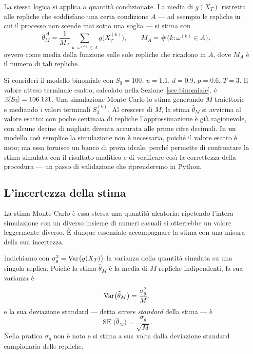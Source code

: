 La stessa logica si applica a quantit\`{a} condizionate. La media di
$g(X_T)$ ristretta alle repliche che soddisfano una certa condizione
$A$ --- ad esempio le repliche in cui il processo non scende mai sotto
una soglia --- si stima con
\[
\widehat{\theta}_M^{\,A}
=\frac{1}{M_A}\sum_{k:\,\omega^{(k)}\in A}g\bigl(X_T^{(k)}\bigr),
\qquad
M_A=\#\{k:\omega^{(k)}\in A\},
\]
ovvero come media della funzione sulle sole repliche che ricadono in $A$,
dove $M_A$ \`{e} il numero di tali repliche.

\begin{example}
\label{es:montecarlo-binomiale}
Si consideri il modello binomiale con $S_0=100$, $u=1.1$, $d=0.9$,
$p=0.6$, $T=3$. Il valore atteso terminale esatto, calcolato nella
Sezione~\ref{sec:binomiale}, \`{e} $\mathbb{E}[S_3]=106.121$. Una simulazione
Monte Carlo lo stima generando $M$ traiettorie e mediando i valori
terminali $S_3^{(k)}$. Al crescere di $M$, la stima
$\widehat{\theta}_M$ si avvicina al valore esatto: con poche centinaia
di repliche l'approssimazione \`{e} gi\`{a} ragionevole, con alcune
decine di migliaia diventa accurata alle prime cifre decimali. In un
modello cos\`{\i} semplice la simulazione non \`{e} necessaria, poich\'{e}
il valore esatto \`{e} noto; ma essa fornisce un banco di prova ideale,
perch\'{e} permette di confrontare la stima simulata con il risultato
analitico e di verificare cos\`{\i} la correttezza della procedura ---
un passo di validazione che riprenderemo in Python.
\end{example}

\subsection{L'incertezza della stima}

\noindent
La stima Monte Carlo \`{e} essa stessa una quantit\`{a} aleatoria:
ripetendo l'intera simulazione con un diverso insieme di numeri
casuali si otterrebbe un valore leggermente diverso. \`{E} dunque
essenziale accompagnare la stima con una misura della sua incertezza.

Indichiamo con $\sigma_g^2=\operatorname{Var}\bigl(g(X_T)\bigr)$ la varianza della
quantit\`{a} simulata su una singola replica. Poich\'{e} la stima
$\widehat{\theta}_M$ \`{e} la media di $M$ repliche indipendenti, la
sua varianza \`{e}
\[
\operatorname{Var}\bigl(\widehat{\theta}_M\bigr)=\frac{\sigma_g^2}{M},
\]
e la sua deviazione standard --- detta \emph{errore standard} della
stima --- \`{e}
\[
\operatorname{SE}\bigl(\widehat{\theta}_M\bigr)
=\frac{\sigma_g}{\sqrt{M}}.
\]
Nella pratica $\sigma_g$ non \`{e} noto e si stima a sua volta dalla
deviazione standard campionaria delle repliche.

